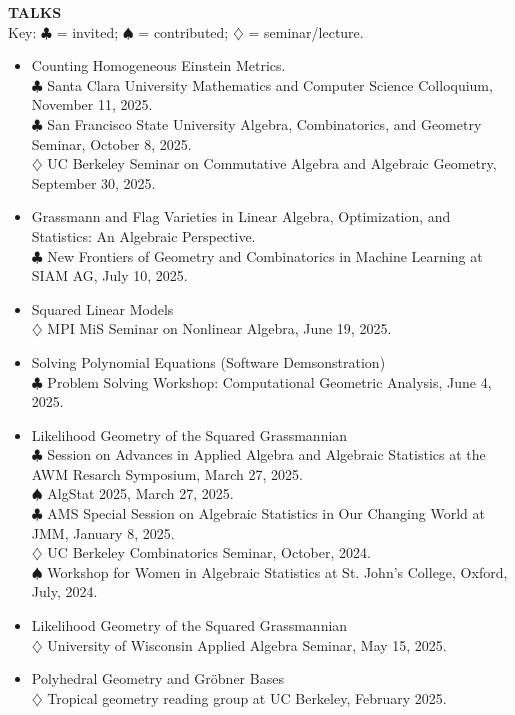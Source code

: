 \documentclass[11pt]{article}
\newcommand{\hdr}[1]{\textcolor{blue(ryb)}{\textbf{#1}}}
\begin{document}
\hdr{TALKS}\\
Key: $\clubsuit$ = invited; $\spadesuit$ = contributed; $\diamondsuit$ = seminar/lecture.
\begin{itemize}
\item Counting Homogeneous Einstein Metrics.\\
  $\clubsuit$ Santa Clara University Mathematics and Computer Science Colloquium, November 11, 2025. \\
  $\clubsuit$ San Francisco State University Algebra, Combinatorics, and Geometry Seminar, October 8, 2025.\\
  $\diamondsuit$ UC Berkeley Seminar on Commutative Algebra and Algebraic Geometry, September 30, 2025. \\
\item Grassmann and Flag Varieties in Linear Algebra, Optimization, and Statistics: An Algebraic Perspective.\\
  $\clubsuit$ New Frontiers of Geometry and Combinatorics in Machine Learning at SIAM AG, July 10, 2025.
\item Squared Linear Models\\
  $\diamondsuit$ MPI MiS Seminar on Nonlinear Algebra, June 19, 2025.
\item Solving Polynomial Equations (Software Demsonstration)\\
  $\clubsuit$  Problem Solving Workshop: Computational Geometric Analysis, June 4, 2025.
\item Likelihood Geometry of the Squared Grassmannian\\
  $\clubsuit$ Session on Advances in Applied Algebra and Algebraic Statistics at the AWM Resarch Symposium, March 27, 2025.\\    
  $\spadesuit$ AlgStat 2025, March 27, 2025.\\  
  $\clubsuit$ AMS Special Session on Algebraic Statistics in Our Changing World at JMM, January 8, 2025.\\
  $\diamondsuit$ UC Berkeley Combinatorics Seminar, October, 2024.\\
  $\spadesuit$ Workshop for Women in Algebraic Statistics at St. John's College, Oxford, July, 2024.
\item Likelihood Geometry of the Squared Grassmannian\\
  $\diamondsuit$ University of Wisconsin Applied Algebra Seminar, May 15, 2025.
\item Polyhedral Geometry and Gr\"{o}bner Bases\\
  $\diamondsuit$ Tropical geometry reading group at UC Berkeley, February 2025. 

\end{itemize}
\end{document}
